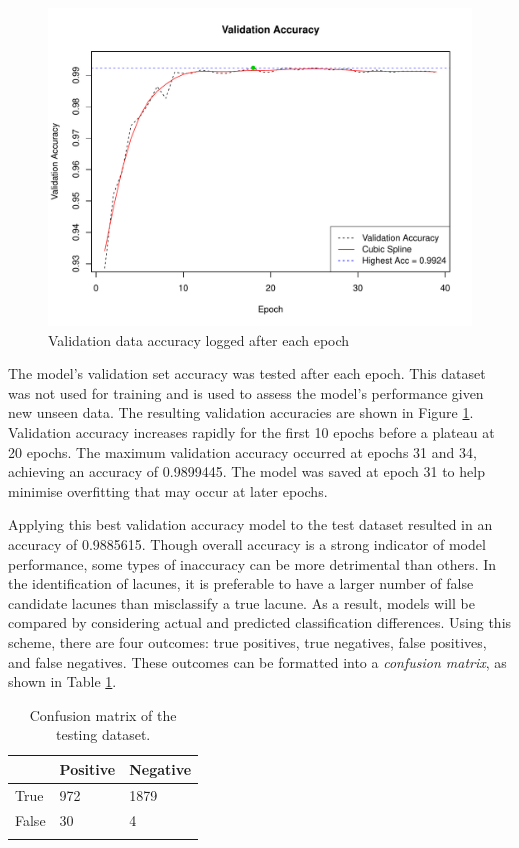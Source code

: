 \begin{figure}[b]
	\centering
	\includegraphics[width=\textwidth]{Images/7_valid_acc4.pdf}
	\caption{Validation data accuracy logged after each epoch}
	\label{results-valid-acc4-fig}
\end{figure}

The model's validation set accuracy was tested after each epoch. This dataset was not used for training and is used to assess the model's performance given new unseen data. The resulting validation accuracies are shown in Figure \ref{results-valid-acc4-fig}. Validation accuracy increases rapidly for the first 10 epochs before a plateau at 20 epochs. The maximum validation accuracy occurred at epochs 31 and 34, achieving an accuracy of 0.9899445. The model was saved at epoch 31 to help minimise overfitting that may occur at later epochs.

Applying this best validation accuracy model to the test dataset resulted in an accuracy of 0.9885615. Though overall accuracy is a strong indicator of model performance, some types of inaccuracy can be more detrimental than others. In the identification of lacunes, it is preferable to have a larger number of false candidate lacunes than misclassify a true lacune. As a result, models will be compared by considering actual and predicted classification differences. Using this scheme, there are four outcomes: true positives, true negatives, false positives, and false negatives. These outcomes can be formatted into a \textit{confusion matrix}, as shown in Table \ref{results-confmat4-tab}.

\begin{table}[ht]
	\centering
	\begin{tabular}{@{}lll@{}}
	\toprule[1.5pt]
	& Positive & Negative\\
	\midrule
	True & 972 & 1879\\
	False & 30 & 4\\
	\bottomrule[1.5pt]\\
	\end{tabular}
	\caption{Confusion matrix of the testing dataset.}
	\label{results-confmat4-tab}
\end{table}

